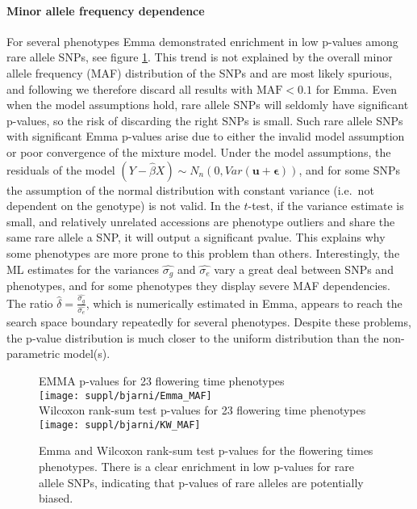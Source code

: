 \documentclass[10pt]{article}
\begin{document}
\paragraph*{Minor allele frequency dependence}

For several phenotypes Emma demonstrated enrichment in low p-values among rare allele SNPs, see figure \ref{fig:emma_maf}.  This trend is not explained by the overall minor allele frequency (MAF) distribution of the SNPs and are most likely spurious, and following \cite{kang08} we therefore discard all results with $\textrm{MAF} <0.1$ for Emma.  Even when the model assumptions hold, rare allele SNPs will seldomly have significant p-values, so the risk of discarding the right SNPs is small.    Such rare allele SNPs with significant Emma p-values arise due to either the invalid model assumption or poor convergence of the mixture model.  Under the model assumptions, the residuals of the model $(Y-\hat{\beta} X)\sim N_n(0,Var(\mathbf{u}+\mathbf{\epsilon}))$, and for some SNPs the assumption of the normal distribution with constant variance (i.e.~not dependent on the genotype) is not valid.  In the $t$-test, if the variance estimate is small, and relatively unrelated accessions are phenotype outliers and share the same rare allele a SNP, it will output a significant pvalue.  This explains why some phenotypes are more prone to this problem than others.  Interestingly, the ML estimates for the variances $\hat{\sigma_{g}}$ and $\hat{\sigma_{e}}$ vary a great deal between SNPs and phenotypes, and for some phenotypes they display severe MAF dependencies.  The ratio $\hat{\delta} = \frac{\hat{\sigma_{g}}}{\hat{\sigma_{e}}}$, which is numerically estimated in Emma, appears to reach the search space boundary repeatedly for several phenotypes.  Despite these problems, the p-value distribution is much closer to the uniform distribution than the non-parametric model(s).

\begin{figure}
  \centering
  EMMA p-values for 23 flowering time phenotypes\\
  \texttt{[image: suppl/bjarni/Emma\_MAF]}\\[0.2in]
  Wilcoxon rank-sum test p-values for 23 flowering time phenotypes\\
  \texttt{[image: suppl/bjarni/KW\_MAF]}
  \caption{Emma and Wilcoxon rank-sum test p-values for the flowering times phenotypes.  There is a clear enrichment in low p-values for rare allele SNPs, indicating that p-values of rare alleles are potentially biased.}
  \label{fig:emma_maf}
\end{figure}
\end{document}
